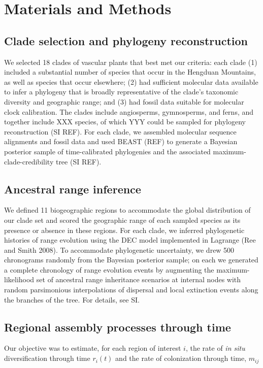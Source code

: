 \section{Materials and Methods}

\subsection{Clade selection and phylogeny reconstruction}

We selected 18 clades of vascular plants that best met our criteria: each clade (1) included a substantial number of species that occur in the Hengduan Mountains, as well as species that occur elsewhere; (2) had sufficient molecular data available to infer a phylogeny that is broadly representative of the clade's taxonomic diversity and geographic range; and (3) had fossil data suitable for molecular clock calibration. The clades include angiosperms, gymnosperms, and ferns, and together include XXX species, of which YYY could be sampled for phylogeny reconstruction (SI REF). For each clade, we assembled molecular sequence alignments and fossil data and used BEAST (REF) to generate a Bayesian posterior sample of time-calibrated phylogenies and the associated maximum-clade-credibility tree (SI REF).

\subsection{Ancestral range inference}

We defined 11 biogeographic regions to accommodate the global distribution of our clade set and scored the geographic range of each sampled species as its presence or absence in these regions. For each clade, we inferred phylogenetic histories of range evolution using the DEC model implemented in Lagrange (Ree and Smith 2008). To accommodate phylogenetic uncertainty, we drew 500 chronograms randomly from the Bayesian posterior sample; on each we generated a complete chronology of range evolution events by augmenting the maximum-likelihood set of ancestral range inheritance scenarios at internal nodes with random parsimonious interpolations of dispersal and local extinction events along the branches of the tree. For details, see SI.

\subsection{Regional assembly processes through time}

Our objective was to estimate, for each region of interest $i$, the rate of \textit{in situ} diversification through time $r_i(t)$ and the rate of colonization through time, $m_{ij}$